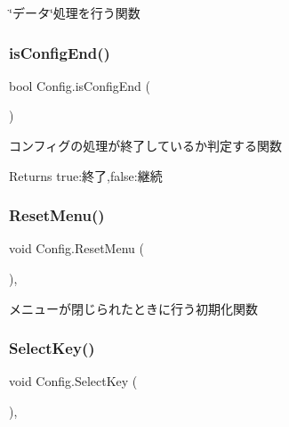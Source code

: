 \char`\"{}データ\char`\"{}処理を行う関数 

\mbox{\label{class_config_af38d765e1fafbca28181b723a067b109}} 
\subsubsection{\texorpdfstring{is\+Config\+End()}{isConfigEnd()}}
{\footnotesize\ttfamily bool Config.\+is\+Config\+End (\begin{DoxyParamCaption}{ }\end{DoxyParamCaption})\hspace{0.3cm}{\ttfamily [inline]}}



コンフィグの処理が終了しているか判定する関数 

\begin{DoxyReturn}{Returns}
true\+:終了,false\+:継続
\end{DoxyReturn}
\mbox{\label{class_config_a3470f1dc49c85032a1e247d817413508}} 
\subsubsection{\texorpdfstring{Reset\+Menu()}{ResetMenu()}}
{\footnotesize\ttfamily void Config.\+Reset\+Menu (\begin{DoxyParamCaption}{ }\end{DoxyParamCaption})\hspace{0.3cm}{\ttfamily [inline]}, {\ttfamily [private]}}



メニューが閉じられたときに行う初期化関数 

\mbox{\label{class_config_a39b12148009099d6797eefdf491e57f2}} 
\subsubsection{\texorpdfstring{Select\+Key()}{SelectKey()}}
{\footnotesize\ttfamily void Config.\+Select\+Key (\begin{DoxyParamCaption}{ }\end{DoxyParamCaption})\hspace{0.3cm}{\ttfamily [inline]}, {\ttfamily [private]}}




